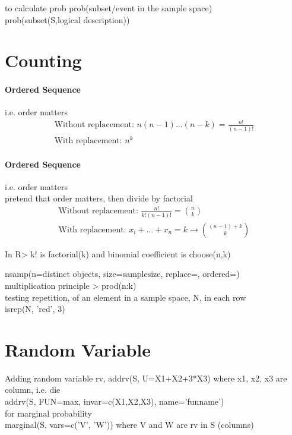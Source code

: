 \documentclass[12pt,a4paper]{report}
\begin{document}
to calculate prob
prob(subset/event in the sample space)  \\
prob(subset(S,logical description))



\section{Counting}
\paragraph{Ordered Sequence}
i.e. order matters
\begin{align}
\text{Without replacement: } n(n-1)...(n-k) = \frac{n!}{(n-1)!}\\
\text{With replacement: } n^k
\end{align}

\paragraph{Ordered Sequence}
i.e. order matters\\
pretend that order matters, then divide by factorial
\begin{align}
\text{Without replacement: } \frac{n!}{k!(n-1)!} = \binom{n}{k}  \\
\text{With replacement: } x_i+...+x_n = k \rightarrow \binom{(n-1)+k}{k}
\end{align}

In R> k!  is factorial(k)
and binomial coefficient is choose(n,k)

nsamp(n=distinct objects, size=samplesize, replace=, ordered=)\\

multiplication principle > prod(n:k)  \\

testing repetition, of an element in a sample space, N, in each row\\

isrep(N, 'red', 3)

\section{Random Variable} 
Adding random variable rv,
addrv(S, U=X1+X2+3*X3)
where x1, x2, x3 are column, i.e. die\\
addrv(S, FUN=max, invar=c(X1,X2,X3), name='funname')\\

for marginal probability\\
marginal(S, vars=c('V', 'W')) where V and W are rv in S (columns)
\end{document}
